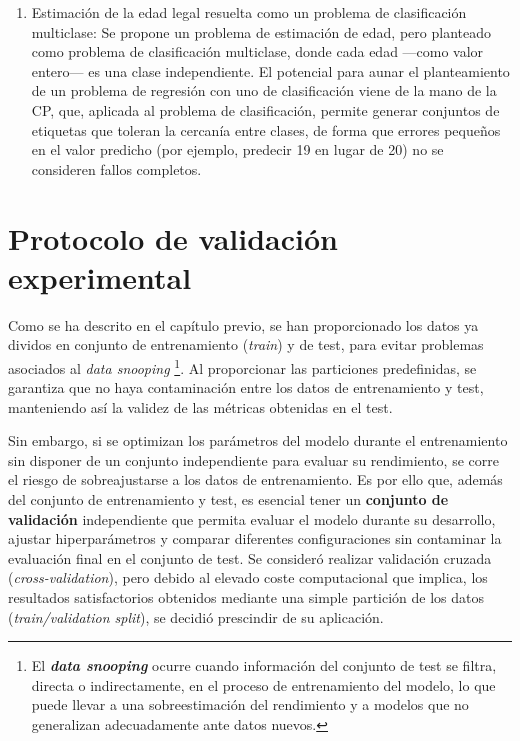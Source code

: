 \begin{enumerate}
    \item Estimación de la edad legal resuelta como un problema de clasificación multiclase: Se propone un problema de estimación de edad, pero planteado como problema de clasificación multiclase, donde cada edad ---como valor entero--- es una clase independiente. El potencial para aunar el planteamiento de un problema de regresión con uno de clasificación viene de la mano de la \acrshort{CP}, que, aplicada al problema de clasificación, permite generar conjuntos de etiquetas que toleran la cercanía entre clases, de forma que errores pequeños en el valor predicho (por ejemplo, predecir 19 en lugar de 20) no se consideren fallos completos.

\end{enumerate}


\section{Protocolo de validación experimental}

Como se ha descrito en el capítulo previo, se han proporcionado los datos ya dividos en conjunto de entrenamiento (\textit{train}) y de test, para evitar problemas asociados al \textit{data snooping}%
\footnote{
    El \textbf{\textit{data snooping}} ocurre cuando información del conjunto de test se filtra, directa o indirectamente, en el proceso de entrenamiento del modelo, lo que puede llevar a una sobreestimación del rendimiento y a modelos que no generalizan adecuadamente ante datos nuevos.
}.
Al proporcionar las particiones predefinidas, se garantiza que no haya contaminación entre los datos de entrenamiento y test, manteniendo así la validez de las métricas obtenidas en el test. 

Sin embargo, si se optimizan los parámetros del modelo durante el entrenamiento sin disponer de un conjunto independiente para evaluar su rendimiento, se corre el riesgo de sobreajustarse a los datos de entrenamiento. Es por ello que, además del conjunto de entrenamiento y test, es esencial tener un \textbf{conjunto de validación} independiente que permita evaluar el modelo durante su desarrollo, ajustar hiperparámetros y comparar diferentes configuraciones sin contaminar la evaluación final en el conjunto de test. Se consideró realizar validación cruzada (\textit{cross-validation}), pero debido al elevado coste computacional que implica, los resultados satisfactorios obtenidos mediante una simple partición de los datos (\textit{train/validation split}), se decidió prescindir de su aplicación.

